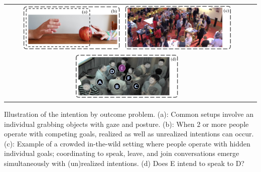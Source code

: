 \documentclass[manuscript,screen,review]{acmart}
\begin{document}
\begin{teaserfigure}
    \centering
  \begin{tabular}{cc}
\includegraphics[width=0.87\textwidth]{samples/Teaser.png} & \\ \includegraphics[width=0.43\textwidth]{samples/AnnotatedSocialStill.png}
  \end{tabular}
  \caption{Illustration of the intention by outcome problem. (a): Common setups involve an individual grabbing objects with gaze and posture. (b): When 2 or more people operate with competing goals, realized as well as unrealized intentions can occur. (c): Example of a crowded in-the-wild setting where people operate with hidden individual goals; coordinating to speak, leave, and join conversations emerge simultaneously with (un)realized intentions. (d) Does E intend to speak to D?}
  \label{fig:teaser}
\end{teaserfigure}
\end{document}
